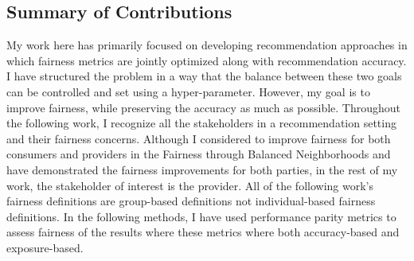 \subsection{Summary of Contributions}

My work here has primarily focused on developing recommendation approaches in which fairness metrics are jointly optimized along with recommendation accuracy. I have structured the problem in a way that the balance between these two goals can be controlled and set using a hyper-parameter. However, my goal is to improve fairness, while preserving the accuracy as much as possible. Throughout the following work, I recognize all the stakeholders in a recommendation setting and their fairness concerns. Although I considered to improve fairness for both consumers and providers in the Fairness through Balanced Neighborhoods and have demonstrated the fairness improvements for both parties, in the rest of my work, the stakeholder of interest is the provider. All of the following work's fairness definitions are group-based definitions not individual-based fairness definitions. In the following methods, I have used performance parity metrics to assess fairness of the results where these metrics where both accuracy-based and exposure-based.

